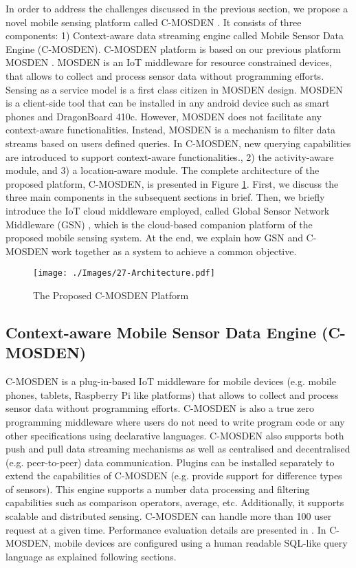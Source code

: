 \documentclass[journal]{IEEEtran}
\newcommand{\platform}{C-MOSDEN }
\begin{document}
In order to address the challenges discussed in the previous section, we propose a novel mobile sensing platform called \platform. It consists of three components: 1) Context-aware data streaming engine called Mobile Sensor Data Engine (C-MOSDEN). C-MOSDEN platform is based on our previous platform MOSDEN \cite{ZMC008}. MOSDEN is an IoT middleware for resource constrained devices, that allows to collect and process sensor data without programming efforts. Sensing as a service model \cite{ZMP008} is a first class citizen in MOSDEN design.  MOSDEN is a client-side tool that can be installed in any android device such as smart phones and DragonBoard 410c. However, MOSDEN does not facilitate any context-aware functionalities. Instead, MOSDEN is a mechanism to filter data streams based on users defined queries. In C-MOSDEN,  new  querying capabilities are introduced to support context-aware functionalities., 2) the activity-aware module, and 3) a location-aware module. The complete architecture of the proposed platform, C-MOSDEN, is presented in Figure \ref{Figure:Architecture}. First, we discuss the three main components  in the subsequent sections in brief. Then, we briefly introduce the IoT cloud middleware employed, called Global Sensor Network Middleware (GSN) \cite{P022},  which is the cloud-based companion platform of the proposed mobile sensing system. At the end, we explain how GSN and C-MOSDEN work together as a system to achieve a common objective.


\begin{figure}[h]
 \centering
 \vspace{-0.23cm}
 \texttt{[image: ./Images/27-Architecture.pdf]}
\caption{The Proposed C-MOSDEN Platform}
 \label{Figure:Architecture}	
\vspace{-0.53cm}	
\end{figure}





\subsection{Context-aware Mobile Sensor Data Engine (C-MOSDEN)}
C-MOSDEN is a plug-in-based IoT middleware for mobile devices (e.g. mobile phones, tablets, Raspberry Pi like platforms) that allows to collect and process sensor data without programming efforts. C-MOSDEN is also a true zero programming middleware where users do not need to write program code or any other specifications using declarative languages. C-MOSDEN also supports both push and pull data streaming mechanisms as well as centralised and decentralised (e.g. peer-to-peer) data communication. Plugins can be installed separately to extend the capabilities of C-MOSDEN (e.g. provide support for difference types of sensors). This engine supports a number data processing and filtering capabilities such as comparison operators, average, etc. Additionally, it supports scalable and distributed sensing. C-MOSDEN can handle more than 100 user request at a given time. Performance evaluation details are presented in \cite{ZMC008, ZMP010}. In C-MOSDEN, mobile devices are configured using a human readable SQL-like query language as explained following sections.
\end{document}
